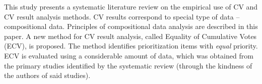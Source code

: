 This study presents a systematic literature review on the empirical use of CV and CV result analysis methods.
CV results correspond to special type of data -- compositional data. Principles of compositional data analysis are described in this paper.
A new method for CV result analysis, called Equality of Cumulative Votes (ECV), is proposed.
The method identifies prioritization items with \emph{equal} priority.
ECV is evaluated using a considerable amount of data, which was obtained from the primary studies identified by the systematic review (through the kindness of the authors of said studies).

